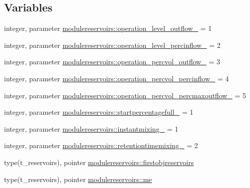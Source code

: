 \subsection*{Variables}
\begin{DoxyCompactItemize}
\item 
integer, parameter \mbox{\hyperlink{namespacemodulereservoirs_a19b393dc0624488197fbecad37587566}{modulereservoirs\+::operation\+\_\+level\+\_\+outflow\+\_\+}} = 1
\item 
integer, parameter \mbox{\hyperlink{namespacemodulereservoirs_af9fabeb6c84ab0b9a68fff20028bd317}{modulereservoirs\+::operation\+\_\+level\+\_\+percinflow\+\_\+}} = 2
\item 
integer, parameter \mbox{\hyperlink{namespacemodulereservoirs_a34788723d1f6ba791d0344811d1907bc}{modulereservoirs\+::operation\+\_\+percvol\+\_\+outflow\+\_\+}} = 3
\item 
integer, parameter \mbox{\hyperlink{namespacemodulereservoirs_ab76bcba6606b22f86a6e7a9ca61fa934}{modulereservoirs\+::operation\+\_\+percvol\+\_\+percinflow\+\_\+}} = 4
\item 
integer, parameter \mbox{\hyperlink{namespacemodulereservoirs_a5b1a48d491a0ed184c0a3ae8af4140af}{modulereservoirs\+::operation\+\_\+percvol\+\_\+percmaxoutflow\+\_\+}} = 5
\item 
integer, parameter \mbox{\hyperlink{namespacemodulereservoirs_af656754da8b9984c6c96e6c670f23d02}{modulereservoirs\+::startpercentagefull\+\_\+}} = 1
\item 
integer, parameter \mbox{\hyperlink{namespacemodulereservoirs_a0ab14e4de96cf34622fde6a0957a5313}{modulereservoirs\+::instantmixing\+\_\+}} = 1
\item 
integer, parameter \mbox{\hyperlink{namespacemodulereservoirs_a75087a570e215ca36c369207496fd7a7}{modulereservoirs\+::retentiontimemixing\+\_\+}} = 2
\item 
type(t\+\_\+reservoirs), pointer \mbox{\hyperlink{namespacemodulereservoirs_a2579611f53e15ae9991a82aefe41a57f}{modulereservoirs\+::firstobjreservoirs}}
\item 
type(t\+\_\+reservoirs), pointer \mbox{\hyperlink{namespacemodulereservoirs_a1c6b704e6fc6d68170696d5d668502ba}{modulereservoirs\+::me}}
\end{DoxyCompactItemize}
